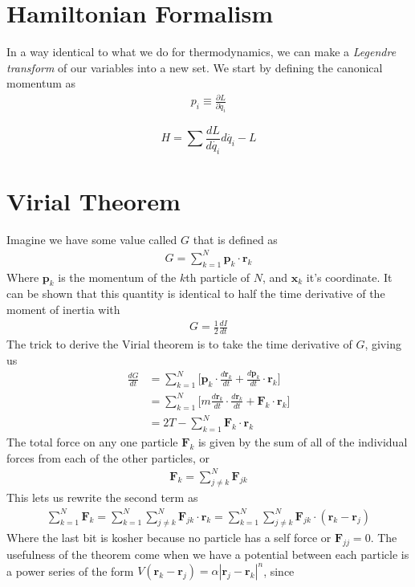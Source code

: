\section{Hamiltonian Formalism}
In a way identical to what we do for thermodynamics, we can make a \emph{Legendre transform} of our variables into a new set. We start by defining the canonical momentum as
\begin{align}
p_i \equiv \frac{\partial L}{\partial \dot{q}_i}
\end{align}

$$H = \sum\frac{dL}{d\dot{q_i}}d\dot{q_i} - L$$

\section{Virial Theorem}
Imagine we have some value called $G$ that is defined as
\begin{align}
G = \sum_{k=1}^N \textbf{p}_k\cdot\textbf{r}_k
\end{align}
Where $\textbf{p}_k$ is the momentum of the $k$th particle of $N$, and $\textbf{x}_k$ it's coordinate. It can be shown\cite{goldstein} that this quantity is identical to half the time derivative of the moment of inertia with
\begin{align}
G = \frac{1}{2}\frac{dI}{dt}
\end{align}
The trick to derive the Virial theorem is to take the time derivative of $G$, giving us
\begin{align}
\frac{dG}{dt} &= \sum_{k=1}^N \Big[\textbf{p}_k\cdot\frac{d\textbf{r}_k}{dt} + \frac{d\textbf{p}_k}{dt}\cdot\textbf{r}_k\Big]\\
&= \sum_{k=1}^N \Big[m\frac{d\textbf{r}_k}{dt}\cdot\frac{d\textbf{r}_k}{dt} + \textbf{F}_k\cdot\textbf{r}_k\Big]\\
&= 2T - \sum_{k=1}^N \textbf{F}_k\cdot\textbf{r}_k
\end{align}
The total force on any one particle $\textbf{F}_k$ is given by the sum of all of the individual forces from each of the other particles, or
\begin{align}
\textbf{F}_k = \sum_{j\neq k}^N \textbf{F}_{jk}
\end{align}
This lets us rewrite the second term as
\begin{align}
\sum_{k=1}^N \textbf{F}_k = \sum_{k=1}^N \sum_{j\neq k}^N \textbf{F}_{jk}\cdot\textbf{r}_k = \sum_{k=1}^N \sum_{j\neq k}^N \textbf{F}_{jk}\cdot(\textbf{r}_k - \textbf{r}_j)
\end{align}
Where the last bit is kosher because no particle has a self force or $\textbf{F}_{jj} = 0$. The usefulness of the theorem come when we have a potential between each particle is a power series of the form $V(\textbf{r}_k - \textbf{r}_j)  = \alpha |\textbf{r}_j-\textbf{r}_k|^n$, since

